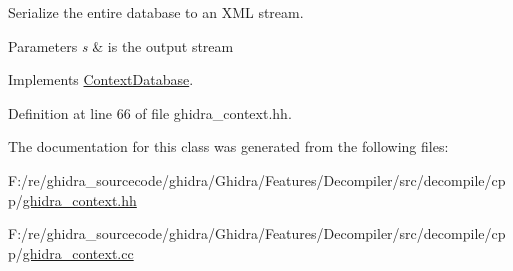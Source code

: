 Serialize the entire database to an X\+ML stream. 


\begin{DoxyParams}{Parameters}
{\em s} & is the output stream \\
\hline
\end{DoxyParams}


Implements \mbox{\hyperlink{class_context_database_aaf116d099044b04dbcb6d83a079b1836}{Context\+Database}}.



Definition at line 66 of file ghidra\+\_\+context.\+hh.



The documentation for this class was generated from the following files\+:\begin{DoxyCompactItemize}
\item 
F\+:/re/ghidra\+\_\+sourcecode/ghidra/\+Ghidra/\+Features/\+Decompiler/src/decompile/cpp/\mbox{\hyperlink{ghidra__context_8hh}{ghidra\+\_\+context.\+hh}}\item 
F\+:/re/ghidra\+\_\+sourcecode/ghidra/\+Ghidra/\+Features/\+Decompiler/src/decompile/cpp/\mbox{\hyperlink{ghidra__context_8cc}{ghidra\+\_\+context.\+cc}}\end{DoxyCompactItemize}
